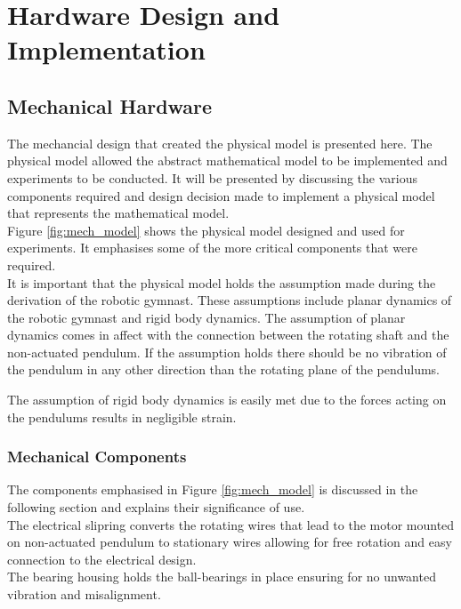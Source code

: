 \chapter{Hardware Design and Implementation}


\section{Mechanical Hardware}
The mechancial design that created the physical model is presented here. The physical model allowed the abstract mathematical model to be implemented and experiments to be conducted. It will be presented by discussing the various components required and design decision made to implement a physical model that represents the mathematical model.\\

Figure \ref{fig:mech_model} shows the physical model designed and used for experiments. It emphasises some of the more critical components that were required.\\

It is important that the physical model holds the assumption made during the derivation of the robotic gymnast. These assumptions include planar dynamics of the robotic gymnast and rigid body dynamics. The assumption of planar dynamics comes in affect with the connection between the rotating shaft and the non-actuated pendulum. If the assumption holds there should be no vibration of the pendulum in any other direction than the rotating plane of the pendulums. 

The assumption of rigid body dynamics is easily met due to the forces acting on the pendulums results in negligible strain.

\subsection{Mechanical Components}
The components emphasised in Figure \ref{fig:mech_model} is discussed in the following section and explains their significance of use.\\

The electrical slipring converts the rotating wires that lead to the motor mounted on non-actuated pendulum to stationary wires allowing for free rotation and easy connection to the electrical design.\\

The bearing housing holds the ball-bearings in place ensuring for no unwanted vibration and misalignment.

